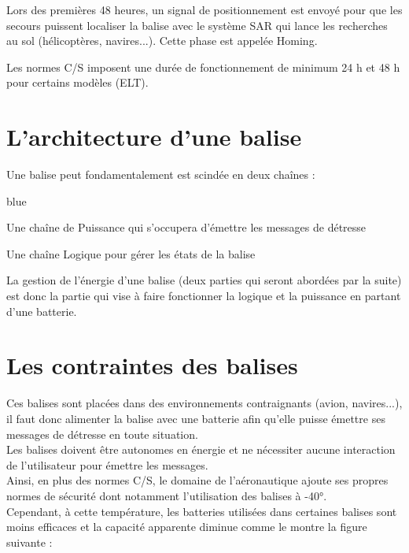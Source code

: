 Lors des premières 48 heures, un signal de positionnement est envoyé pour que les secours puissent localiser la balise avec le système SAR qui lance les recherches au sol (hélicoptères, navires...). Cette phase est appelée Homing.

Les normes C/S imposent une durée de fonctionnement de minimum 24 h et 48 h pour certains modèles (ELT).

\section{L'architecture d'une balise}

Une balise peut fondamentalement est scindée en deux chaînes : 

\begin{items}{blue}{\Circle}
    \item Une chaîne de Puissance qui s'occupera d'émettre les messages de détresse
    \item Une chaîne Logique pour gérer les états de la balise
\end{items}


La gestion de l'énergie d'une balise (deux parties qui seront abordées par la suite) est donc la partie qui vise à faire fonctionner la logique et la puissance en partant d'une batterie.


\section{Les contraintes des balises}

Ces balises sont placées dans des environnements contraignants (avion, navires...), il faut donc alimenter la balise avec une batterie afin qu'elle puisse émettre ses messages de détresse en toute situation.\\Les balises doivent être autonomes en énergie et ne nécessiter aucune interaction de l'utilisateur pour émettre les messages.\\

Ainsi, en plus des normes C/S, le domaine de l'aéronautique ajoute ses propres normes de sécurité dont notamment l'utilisation des balises à -40°.\\
Cependant, à cette température, les batteries utilisées dans certaines balises sont moins efficaces et la capacité apparente diminue comme le montre la figure suivante :\\

